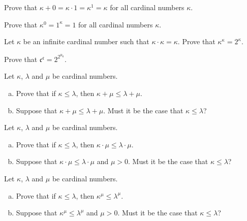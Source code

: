 \begin{chapex}
Prove that $\kappa + 0 = \kappa \cdot 1 = \kappa^1 = \kappa$ for all cardinal numbers $\kappa$.
\end{chapex}

\begin{chapex}
Prove that $\kappa^0 = 1^{\kappa} = 1$ for all cardinal numbers $\kappa$.
\end{chapex}

\begin{chapex}
Let $\kappa$ be an infinite cardinal number such that $\kappa \cdot \kappa = \kappa$. Prove that $\kappa^{\kappa} = 2^{\kappa}$.
\end{chapex}

\begin{chapex}
Prove that $\mathfrak{c}^{\mathfrak{c}} = 2^{2^{\aleph_0}}$.
\end{chapex}

\begin{chapex}
Let $\kappa$, $\lambda$ and $\mu$ be cardinal numbers.
\begin{enumerate}[(a)]
\item Prove that if $\kappa \le \lambda$, then $\kappa + \mu \le \lambda + \mu$.
\item Suppose that $\kappa + \mu \le \lambda + \mu$. Must it be the case that $\kappa \le \lambda$?
\end{enumerate}
\end{chapex}

\begin{chapex}
Let $\kappa$, $\lambda$ and $\mu$ be cardinal numbers.
\begin{enumerate}[(a)]
\item Prove that if $\kappa \le \lambda$, then $\kappa \cdot \mu \le \lambda \cdot \mu$.
\item Suppose that $\kappa \cdot \mu \le \lambda \cdot \mu$ and $\mu > 0$. Must it be the case that $\kappa \le \lambda$?
\end{enumerate}
\end{chapex}

\begin{chapex}
Let $\kappa$, $\lambda$ and $\mu$ be cardinal numbers.
\begin{enumerate}[(a)]
\item Prove that if $\kappa \le \lambda$, then $\kappa^{\mu} \le \lambda^{\mu}$.
\item Suppose that $\kappa^{\mu} \le \lambda^{\mu}$ and $\mu > 0$. Must it be the case that $\kappa \le \lambda$?
\end{enumerate}
\end{chapex}

